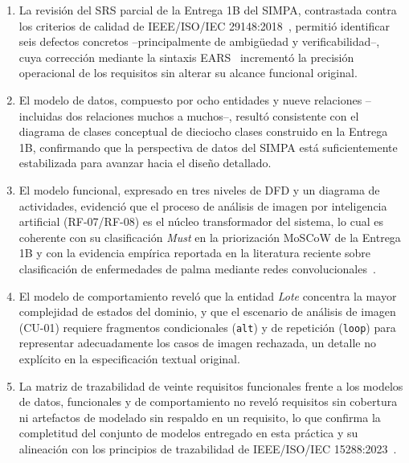 \documentclass[11pt,a4paper]{report}
\begin{document}
\begin{enumerate}[label=\arabic*.]

\item La revisión del SRS parcial de la Entrega 1B del SIMPA, contrastada contra los criterios de
calidad de IEEE/ISO/IEC 29148:2018~\cite{ieee29148}, permitió identificar seis defectos concretos
--principalmente de ambigüedad y verificabilidad--, cuya corrección mediante la sintaxis
EARS~\cite{mavin2009} incrementó la precisión operacional de los requisitos sin alterar su alcance
funcional original.

\item El modelo de datos, compuesto por ocho entidades y nueve relaciones --incluidas dos relaciones
muchos a muchos--, resultó consistente con el diagrama de clases conceptual de dieciocho clases
construido en la Entrega 1B, confirmando que la perspectiva de datos del SIMPA está suficientemente
estabilizada para avanzar hacia el diseño detallado.

\item El modelo funcional, expresado en tres niveles de DFD y un diagrama de actividades, evidenció
que el proceso de análisis de imagen por inteligencia artificial (RF-07/RF-08) es el núcleo
transformador del sistema, lo cual es coherente con su clasificación \textit{Must} en la priorización
MoSCoW de la Entrega 1B y con la evidencia empírica reportada en la literatura reciente sobre
clasificación de enfermedades de palma mediante redes convolucionales~\cite{abuzanona2022,hamdani2021}.

\item El modelo de comportamiento reveló que la entidad \textit{Lote} concentra la mayor complejidad
de estados del dominio, y que el escenario de análisis de imagen (CU-01) requiere fragmentos
condicionales (\texttt{alt}) y de repetición (\texttt{loop}) para representar adecuadamente los
casos de imagen rechazada, un detalle no explícito en la especificación textual original.

\item La matriz de trazabilidad de veinte requisitos funcionales frente a los modelos de datos,
funcionales y de comportamiento no reveló requisitos sin cobertura ni artefactos de modelado sin
respaldo en un requisito, lo que confirma la completitud del conjunto de modelos entregado en esta
práctica y su alineación con los principios de trazabilidad de IEEE/ISO/IEC 15288:2023~\cite{ieee15288}.

\end{enumerate}
\end{document}
